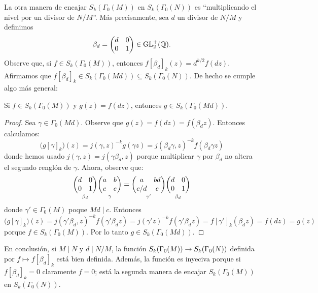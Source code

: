 La otra manera de encajar $S_k(\Gamma_0(M))$ en $S_k(\Gamma_0(N))$ es ``multiplicando el nivel
por un divisor
de $N/M$''. M\'as precisamente, sea $d$ un divisor de $N/M$ y definimos
\[
  \beta_d=\begin{pmatrix}d & 0\\ 0 & 1\end{pmatrix}\in\mathrm{GL}_2^+(\mathbb{Q}).
\]
Observe que, si $f\in S_k(\Gamma_0(M))$, entonces $f[\beta_d]_k(z)=d^{k/2}f(dz)$. Afirmamos que
$f[\beta_d]_k\in S_k(\Gamma_0(Md))\subseteq S_k(\Gamma_0(N))$. De hecho se cumple algo m\'as general:

\begin{lema}\label{lema:subir_nivel_formas}
  Si $f\in S_k(\Gamma_0(M))$ y $g(z)=f(dz)$, entonces $g\in S_k(\Gamma_0(Md))$. 
\end{lema}
\begin{proof}
  Sea $\gamma\in\Gamma_0(Md)$. Observe que $g(z)=f(dz)=f(\beta_dz)$. Entonces
  calculamos:
  \[
    \big(g[\gamma]_k\big)(z)
    =j(\gamma,z)^{-k}g(\gamma z)
    =j(\beta_d\gamma,z)^{-k}f(\beta_d\gamma z)
  \]
  donde hemos usado $j(\gamma,z)=j(\gamma\beta_d, z)$ porque multiplicar $\gamma$ por $\beta_d$ no
  altera el segundo rengl\'on de $\gamma$. Ahora, observe que:
  \[
    \underset{\beta_d}{\begin{pmatrix}d & 0\\ 0 & 1\end{pmatrix}}\underset{\gamma}{\begin{pmatrix}a & b\\ c & e\end{pmatrix}}
    =\underset{\gamma'}{\begin{pmatrix}a & bd\\ c/d & e\end{pmatrix}}\underset{\beta_d}{\begin{pmatrix}d & 0\\ 0 & 1\end{pmatrix}}
  \]
  donde $\gamma'\in\Gamma_0(M)$ poque $Md\mid c$. Entonces
  \[
    \big(g[\gamma]_k\big)(z)
    =j(\gamma'\beta_d,z)^{-k}f(\gamma'\beta_d z)
    =j(\gamma'z)^{-k}f(\gamma'\beta_d z)
    =f[\gamma']_k(\beta_dz)
    =f(dz)=g(z)
  \]
  porque $f\in S_k(\Gamma_0(M))$. Por lo tanto $g\in S_k(\Gamma_0(Md))$.
\end{proof}

En conclusi\'on, si $M\mid N$ y $d\mid N/M$, la funci\'on $S_k(\Gamma_0(M))\rightarrow S_k(\Gamma_0(N))$
definida por $f\mapsto f[\beta_d]_k$ est\'a bien definida. Adem\'as, la funci\'on es inyeciva porque
si $f[\beta_d]_k=0$ claramente $f=0$; est\'a la segunda manera de encajar $S_k(\Gamma_0(M))$ en
$S_k(\Gamma_0(N))$.


